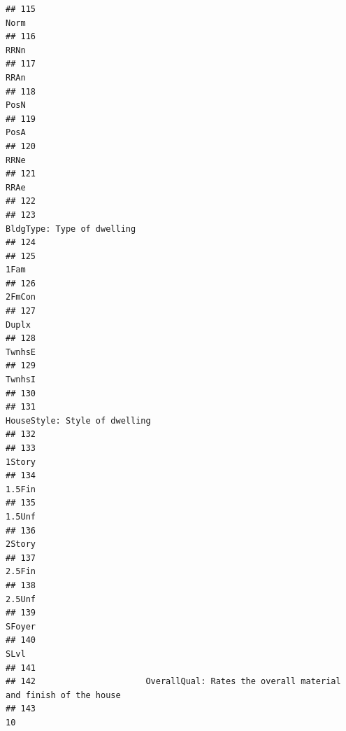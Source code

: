 \documentclass[
]{article}
\begin{document}
\begin{verbatim}
## 115                                                                                 Norm
## 116                                                                                 RRNn
## 117                                                                                 RRAn
## 118                                                                                 PosN
## 119                                                                                 PosA
## 120                                                                                 RRNe
## 121                                                                                 RRAe
## 122                                                                                     
## 123                                                           BldgType: Type of dwelling
## 124                                                                                     
## 125                                                                                 1Fam
## 126                                                                               2FmCon
## 127                                                                                Duplx
## 128                                                                               TwnhsE
## 129                                                                               TwnhsI
## 130                                                                                     
## 131                                                        HouseStyle: Style of dwelling
## 132                                                                                     
## 133                                                                               1Story
## 134                                                                               1.5Fin
## 135                                                                               1.5Unf
## 136                                                                               2Story
## 137                                                                               2.5Fin
## 138                                                                               2.5Unf
## 139                                                                               SFoyer
## 140                                                                                 SLvl
## 141                                                                                     
## 142                      OverallQual: Rates the overall material and finish of the house
## 143                                                                                   10

\end{verbatim}
\end{document}
